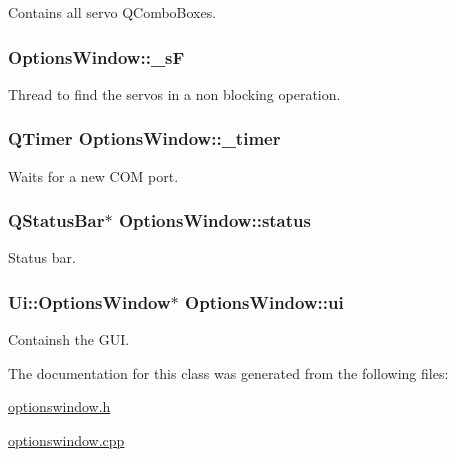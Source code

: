 Contains all servo Q\+Combo\+Boxes. 

\hypertarget{a00006_ab143e1d06250ec778309da1a3807b602}{}
\subsubsection[{\+\_\+s\+F}]{ Options\+Window\+::\+\_\+s\+F\hspace{0.3cm}{\ttfamily [private]}}\label{a00006_ab143e1d06250ec778309da1a3807b602}


Thread to find the servos in a non blocking operation. 

\hypertarget{a00006_af6320942b8558140989f552b3bbc1fbd}{}
\subsubsection[{\+\_\+timer}]{\setlength{\rightskip}{0pt plus 5cm}Q\+Timer Options\+Window\+::\+\_\+timer\hspace{0.3cm}{\ttfamily [private]}}\label{a00006_af6320942b8558140989f552b3bbc1fbd}


Waits for a new C\+O\+M port. 

\hypertarget{a00006_af031403c7017cf086c0b85186c53471e}{}
\subsubsection[{status}]{\setlength{\rightskip}{0pt plus 5cm}Q\+Status\+Bar$\ast$ Options\+Window\+::status\hspace{0.3cm}{\ttfamily [private]}}\label{a00006_af031403c7017cf086c0b85186c53471e}


Status bar. 

\hypertarget{a00006_a8347442d5b3b670e8fff0c4102db1f88}{}
\subsubsection[{ui}]{\setlength{\rightskip}{0pt plus 5cm}Ui\+::\+Options\+Window$\ast$ Options\+Window\+::ui\hspace{0.3cm}{\ttfamily [private]}}\label{a00006_a8347442d5b3b670e8fff0c4102db1f88}


Containsh the G\+U\+I. 



The documentation for this class was generated from the following files\+:\begin{DoxyCompactItemize}
\item 
\hyperlink{a00020}{optionswindow.\+h}\item 
\hyperlink{a00019}{optionswindow.\+cpp}\end{DoxyCompactItemize}
